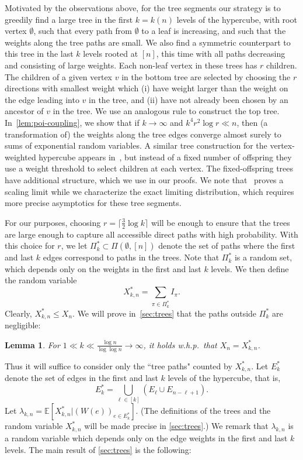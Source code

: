 \documentclass[11pt]{article}
\newtheorem{lemma}[theorem]{Lemma}
\theoremstyle{definition}
\theoremstyle{remark}
\theoremstyle{remark}
\numberwithin{theorem}{section}
\newcommand{\E}{\mathbb{E}}
\begin{document}
Motivated by the observations above, for the tree segments our strategy is to greedily find a large tree in the first $k = k(n)$ levels of the hypercube, with root vertex $\emptyset$, such that every path from $\emptyset$ to a leaf is increasing, and such that the weights along the tree paths are small. We also find a symmetric counterpart to this tree in the last $k$ levels rooted at $[n]$, this time with all paths decreasing and consisting of large weights. Each non-leaf vertex in these trees has $r$ children. The children of a given vertex $v$ in the bottom tree are selected by choosing the $r$ directions with smallest weight which (i) have weight larger than the weight on the edge leading into $v$ in the tree, and (ii) have not already been chosen by an ancestor of $v$ in the tree. We use an analogous rule to construct the top tree. In~\cref{lem:poi-coupling}, we show that if $k \to \infty$ and $k^{4}r^{2}\log r \ll n$, then (a transformation of) the weights along the tree edges converge almost surely to sums of exponential random variables. A similar tree construction for the vertex-weighted hypercube appears in~\cite{berestycki2016number}, but instead of a fixed number of offspring they use a weight threshold to select children at each vertex. The fixed-offspring trees have additional structure, which we use in our proofs. We note that~\cite{berestycki2016number} proves a scaling limit while we characterize the exact limiting distribution, which requires more precise asymptotics for these tree segments.

For our purposes, choosing $r = \lceil \frac{3}{2}\log k\rceil$ will be enough to ensure that the trees are large enough to capture all accessible direct paths with high probability. With this choice for $r$, we let $\Pi^*_k\subset\Pi(\emptyset,[n])$ denote the set of paths where the first and last $k$ edges correspond to paths in the trees. Note that $\Pi_k^*$ is a random set, which depends only on the weights in the first and last $k$ levels. We then define the random variable 
\[
X_{k,n}^{*}=\sum_{\pi\in\Pi_k^*}I_\pi.
\]
Clearly, $X_{k,n}^{*}\le X_{n}$. We will prove in~\cref{sec:trees} that the paths outside $\Pi_k^*$ are negligible:
\begin{lemma}\label{lem:approximation}
    For $1\ll k\ll \frac{\log n}{\log\log n}\to\infty$, it holds w.h.p.\ that $X_n=X_{k,n}^{*}$.
\end{lemma}
Thus it will suffice to consider only the ``tree paths" counted by $X_{k,n}^{*}$. Let $E_{k}^{*}$ denote the set of edges in the first and last $k$ levels of the hypercube, that is,
\[
E^*_k=\bigcup_{\ell\in[k]} (E_{\ell}\cup E_{n-\ell+1}).
\]
Let $\lambda_{k,n} = \E[X_{k,n}^{*}|(W(e))_{e \in E_{k}^{*}}]$. (The definitions of the trees and the random variable $X_{k,n}^{*}$ will be made precise in \cref{sec:trees}.) We remark that $\lambda_{k,n}$ is a random variable which depends only on the edge weights in the first and last $k$ levels. The main result of \cref{sec:trees} is the following:
\end{document}
